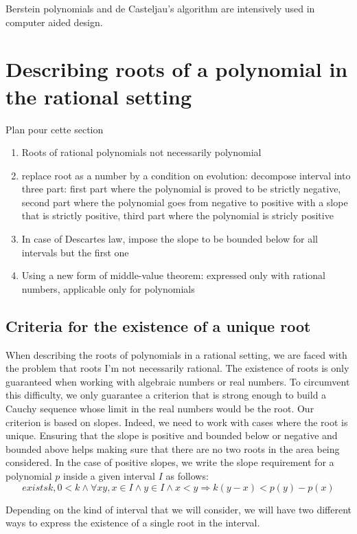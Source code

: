 \documentclass{article}
\begin{document}
Berstein polynomials and de Casteljau's algorithm are intensively used
in computer aided design.

\section{Describing roots of a polynomial in the rational setting}
Plan pour cette section
\begin{enumerate}
\item Roots of rational polynomials not necessarily polynomial
\item replace root as a number by a condition on evolution: decompose interval into three part: first part where the polynomial is proved to be strictly negative, second part where the polynomial goes from negative to positive with a slope that is strictly positive, third part where the polynomial is stricly positive
\item In case of Descartes law, impose the slope to be bounded below for all intervals but the first one
\item Using a new form of middle-value theorem: expressed only with rational numbers, applicable only for polynomials
\end{enumerate}

\subsection{Criteria for the existence of a unique root}
When describing the roots of polynomials in a rational setting, we are
faced with the problem that roots I'm not necessarily rational. The
existence of roots is only guaranteed when working with algebraic
numbers or real numbers. To circumvent this difficulty, we only
guarantee a criterion that is strong enough to build a Cauchy sequence
whose limit in the real numbers would be the root. Our criterion is
based on slopes. Indeed, we need to work with cases where the root is
unique. Ensuring that the slope is positive and bounded below or
negative and bounded above helps making sure that there are no two
roots in the area being considered. In the case of positive slopes, we
write the slope requirement for a polynomial \(p\) inside a given interval
\(I\) as follows:
\[exists k, 0 < k \wedge \forall x y, x \in I \wedge y \in I
\wedge x < y \Rightarrow k(y - x) < p(y) - p (x) \]

Depending on the kind of interval that we will consider, we will have
two different ways to express the existence of a single root in the
interval.
\end{document}
